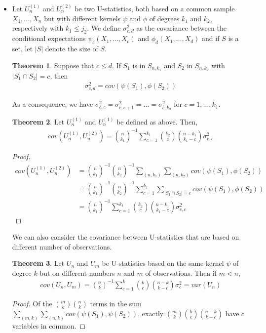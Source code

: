 \documentclass{article}
\theoremstyle{definition}
\newtheorem{theorem}{Theorem}
\numberwithin{Def}{section}
\begin{document}
\begin{itemize}
    \item Let $U_n^{(1)}$ and $U_n^{(2)}$ be two U-statistics, both based on a common sample $X_1, \dotsc, X_n$ but with different kernels $\psi$ and $\phi$ of degrees $k_1$ and $k_2$, respectively with $k_1 \leq j_2$. We define $\sigma_{c,d}^2$ as the covariance between the conditional expectations $\psi_c(X_1, \dotsc, X_c)$ and $\phi_d(X_1, \dotsc, X_d)$ and if $S$ is a set, let $|S|$ denote the size of $S$.
    
    \begin{theorem}
    Suppose that $c \leq d$. If $S_1$ is in $S_{n,k_1}$ and $S_2$ in $S_{n, k_2}$ with $|S_1 \cap S_2| = c$, then 
    \begin{align}
        \sigma_{c,d}^2 = cov(\psi(S_1), \phi(S_2))
    \end{align}
    \end{theorem}
    
    As a consequence, we have $\sigma_{c,c}^2 = \sigma_{c,c+1}^2 = \dotsc = \sigma_{c,k_2}^2$ for $c = 1, \dotsc, k_1$. 
    
    \begin{theorem}
    Let $U_n^{(1)}$ and $U_n^{(1)}$ be defined as above. Then, 
    \begin{align}
        cov(U_n^{(1)}, U_n^{(2)}) = {n \choose k_1}^{-1}\sum_{c=1}^{k_1}{k_2 \choose c}{n-k_1 \choose k_1 - c}\sigma_{c,c}^2
        \end{align}
    \end{theorem}
    \begin{proof}
    \begin{align*}
      cov(U_n^{(1)}, U_n^{(2)}) &= {n \choose k_1}^{-1}{n \choose k_2}^{-1}\sum_{(n,k_1)}\sum_{(n, k_2)} cov(\psi(S_1), \phi(S_2)) \\
      &= {n \choose k_1}^{-1}{n \choose k_2}^{-1}\sum_{c=1}^{k_1}\sum_{|S_1 \cap S_2| = c} cov(\psi(S_1), \phi(S_2)) \\
      &= {n \choose k_1}^{-1}\sum_{c=1}^{k_1}{k_2 \choose c}{n-k_1 \choose k_1 - c}\sigma_{c,c}^2
    \end{align*}
    \end{proof}
    
    We can also consider the covariance between U-statistics that are based on different number of observations. 
    \begin{theorem}
    Let $U_n$ and $U_m$ be U-statistics based on the same kernel $\psi$ of degree $k$ but on different numbers $n$ and $m$ of observations. Then if $m<n$, 
    \begin{align}
        cov(U_n, U_m) = {n \choose k}^{-1} \sum_{c=1}^k {k \choose c}{n-k \choose k-c}\sigma_c^2 = var(U_n)
    \end{align}
    \end{theorem}
    \begin{proof}
    Of the ${m \choose k}{n \choose k}$ terms in the sum $\sum_{(m,k)}\sum_{(n,k)}cov(\psi(S_1), \psi(S_2))$, exactly ${m \choose k}{k \choose c}{n-k \choose k-c}$ have c variables in common. 
    \end{proof}
\end{itemize}
\end{document}
